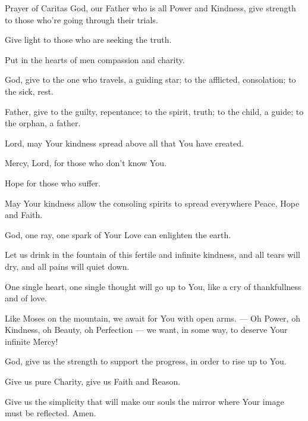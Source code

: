   \begin{passage}[EN]{Prayer of Caritas}
    God, our Father who is all Power and Kindness,
    give strength to those who're going through
    their trials.
    \par
    Give light to those who are seeking the truth.
    \par
    Put in the hearts of men compassion and charity.
    \par
    God, give to the one who travels, a guiding star;
    to the afflicted, consolation; to the sick, rest.
    \par
    Father, give to the guilty, repentance; to the
    spirit, truth; to the child, a guide; to the orphan,
    a father.
    \par
    Lord, may Your kindness spread above all that You
    have created.
    \par
    Mercy, Lord, for those who don't know You.
    \par
    Hope for those who suffer.
    \par
    May Your kindness allow the consoling spirits to
    spread everywhere Peace, Hope and Faith.
    \par
    God, one ray, one spark of Your Love can enlighten
    the earth.
    \par
    Let us drink in the fountain of this fertile and
    infinite kindness, and all tears will dry, and all pains
    will quiet down.
    \par
    One single heart, one single thought will go up to
    You, like a cry of thankfullness and of love.
    \par
    Like Moses on the mountain, we await for You with
    open arms. --- Oh Power, oh Kindness, oh Beauty, oh Perfection --- we want, in some way, to deserve Your infinite Mercy!
    \par
    God, give us the strength to support the progress,
    in order to rise up to You.
    \par
    Give us pure Charity, give us Faith and Reason.
    \par
    Give us the simplicity that will make our souls the
    mirror where Your image must be reflected. Amen.
  \end{passage}
  \renewcommand{\ulPassageBaselineMultiplier}{0.95}%
